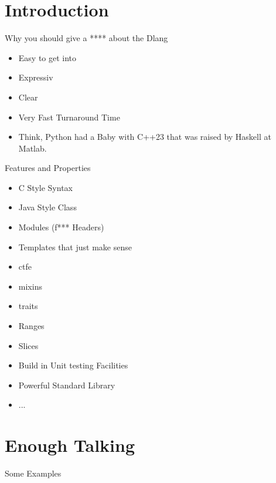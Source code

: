 \documentclass[xelatex,12pt]{beamer}
\begin{document}
\section{Introduction}
\begin{frame}{Why you should give a **** about the Dlang}
	\begin{itemize}
		\item Easy to get into
		\item Expressiv 
		\item Clear
		\item Very Fast Turnaround Time
		\item Think, Python had a Baby with C++23 that was raised by Haskell at
			Matlab.
	\end{itemize}
\end{frame}
\begin{frame}{Features and Properties}
	\begin{itemize}
		\item C Style Syntax
		\item Java Style Class
		\item Modules (f*** Headers)
		\item Templates that just make sense
		\item \gls{ctfe}
		\item mixins
		\item traits
		\item Ranges
		\item Slices
		\item Build in Unit testing Facilities
		\item Powerful Standard Library
		\item ...
	\end{itemize}
\end{frame}

\section{Enough Talking}
\begin{frame}{Some Examples}
\end{frame}
\end{document}
